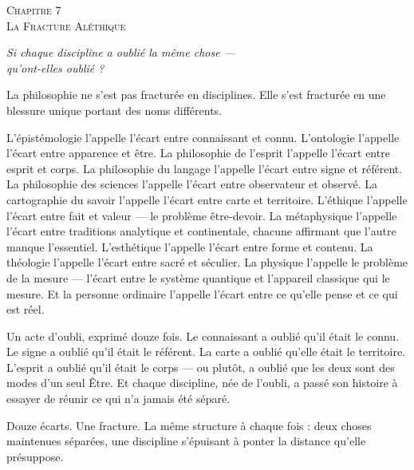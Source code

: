 \documentclass[10pt, openany, oneside]{book}
\renewcommand{\large}{\fontsize{11.5}{14}\selectfont}
\renewcommand{\huge}{\fontsize{17}{21}\selectfont}
\begin{document}
\newpage

\begin{center}
    {\huge\scshape Chapitre 7}\\[0.3em]
    {\large\scshape La Fracture Aléthique}
\end{center}

\vspace{1.5em}

\begin{center}
    \itshape
    Si chaque discipline a oublié la même chose ---\\
    qu'ont-elles oublié ?
\end{center}

\vspace{2em}


\noindent La philosophie ne s'est pas fracturée en disciplines. Elle s'est fracturée en une blessure unique portant des noms différents.

L'épistémologie l'appelle l'écart entre connaissant et connu. L'ontologie l'appelle l'écart entre apparence et être. La philosophie de l'esprit l'appelle l'écart entre esprit et corps. La philosophie du langage l'appelle l'écart entre signe et référent. La philosophie des sciences l'appelle l'écart entre observateur et observé. La cartographie du savoir l'appelle l'écart entre carte et territoire. L'éthique l'appelle l'écart entre fait et valeur --- le problème être-devoir. La métaphysique l'appelle l'écart entre traditions analytique et continentale, chacune affirmant que l'autre manque l'essentiel. L'esthétique l'appelle l'écart entre forme et contenu. La théologie l'appelle l'écart entre sacré et séculier. La physique l'appelle le problème de la mesure --- l'écart entre le système quantique et l'appareil classique qui le mesure. Et la personne ordinaire l'appelle l'écart entre ce qu'elle pense et ce qui est réel.

Un acte d'oubli, exprimé douze fois. Le connaissant a oublié qu'il était le connu. Le signe a oublié qu'il était le référent. La carte a oublié qu'elle était le territoire. L'esprit a oublié qu'il était le corps --- ou plutôt, a oublié que les deux sont des modes d'un seul Être. Et chaque discipline, née de l'oubli, a passé son histoire à essayer de réunir ce qui n'a jamais été séparé.

Douze écarts. Une fracture. La même structure à chaque fois : deux choses maintenues séparées, une discipline s'épuisant à ponter la distance qu'elle présuppose.
\end{document}
